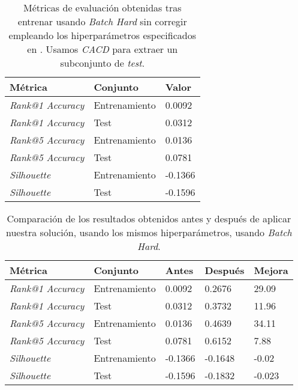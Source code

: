 \begin{table}[!hbtp]
\centering
\begin{tabular}{|l|l|l|}
    \hline
    Métrica & Conjunto & Valor \\
    \hline
    \textit{Rank@1 Accuracy} & Entrenamiento & 0.0092  \\
    \textit{Rank@1 Accuracy} & Test & 0.0312  \\
    \textit{Rank@5 Accuracy} & Entrenamiento & 0.0136   \\
    \textit{Rank@5 Accuracy} & Test & 0.0781  \\
    \textit{Silhouette} & Entrenamiento & -0.1366 \\
    \textit{Silhouette} & Test & -0.1596 \\
    \hline
\end{tabular}
    \caption{Métricas de evaluación obtenidas tras entrenar usando \textit{Batch Hard} sin corregir empleando los hiperparámetros especificados en . Usamos \textit{CACD} para extraer un subconjunto de \textit{test}.}
\label{table:resultados_cacd_mal_nueva}
\end{table}

\begin{table}[!hbtp]
    \centering
    \begin{tabular}{|l|l|l|l|l|}
        \hline
        Métrica & Conjunto & Antes & Después & Mejora \\
        \hline
        \textit{Rank@1 Accuracy} & Entrenamiento & 0.0092 & 0.2676 & 29.09 \\
        \textit{Rank@1 Accuracy} & Test & 0.0312 & 0.3732 & 11.96  \\
        \textit{Rank@5 Accuracy} & Entrenamiento & 0.0136 & 0.4639 & 34.11 \\
        \textit{Rank@5 Accuracy} & Test & 0.0781 & 0.6152 & 7.88  \\
        \textit{Silhouette} & Entrenamiento & -0.1366 & -0.1648 & -0.02 \\
        \textit{Silhouette} & Test & -0.1596 & -0.1832 & -0.023 \\
        \hline
    \end{tabular}
    \caption{Comparación de los resultados obtenidos antes y después de aplicar nuestra solución, usando los mismos hiperparámetros, usando \textit{Batch Hard}.}
    \label{table:comparaciones_cacd_resultados}
\end{table}

